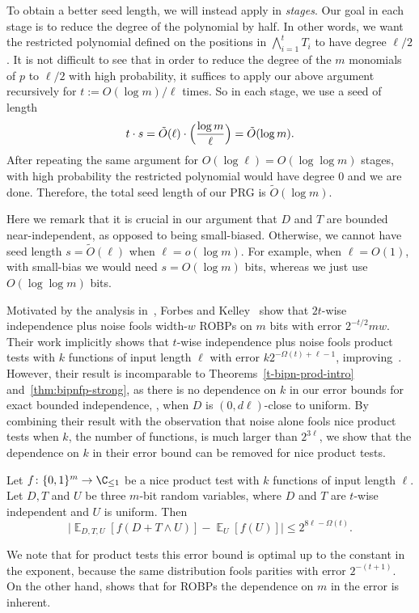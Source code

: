 \documentclass{toc}
\newcommand{\zo}{\{0,1\}}
\def\Blocklength{\ell}
\DeclareMathOperator*{\E}{\mathbb{E}}                 %
\begin{document}
To obtain a better seed length, we will instead apply  in \emph{stages}.
Our goal in each stage is to reduce the degree of the polynomial by half.
In other words, we want the restricted polynomial defined on the positions in
%
$\bigwedge_{i=1}^t T_i$  %
to have degree $\Blocklength/2$.
It is not difficult to see that in order to reduce the degree of the $m$ monomials of $p$ to $\Blocklength/2$ with high probability, it suffices to apply our above argument recursively for $t := O(\log m) / \Blocklength$ times.
So in each stage, we use a seed of length
\[
  t \cdot s = \tilde O(\Blocklength) \cdot \Bigl( \frac{\log m}{\Blocklength} \Bigr) = \tilde O(\log m) .
\]
After repeating the same argument for $O(\log \Blocklength) = O(\log\log m)$ stages, with high probability the restricted polynomial would have degree $0$ and we are done.
Therefore, the total seed length of our PRG is $\tilde O(\log m)$.

Here we remark that it is crucial in our argument that $D$ and $T$ are bounded near-independent, as opposed to being small-biased.
Otherwise, we cannot have seed length $s = \tilde O(\Blocklength)$ when $\Blocklength = o(\log m)$.
For example, when $\Blocklength = O(1)$, with small-bias we would need $s = O(\log m)$ bits, whereas we just use $O(\log \log m)$ bits.

\medskip

Motivated by the analysis in~\cite{HaramatyLV-bipnfp}, Forbes and Kelley~\cite{ForbesK18} show that $2t$-wise independence plus noise fools width-$w$ ROBPs on $m$ bits with error $2^{-t/2} mw$.
Their work implicitly shows that $t$-wise independence plus noise fools product tests with $k$ functions of input length $\Blocklength$ with error $k 2^{-\Omega(t)+\Blocklength-1}$, improving~\cite{HaramatyLV-bipnfp}.
However, their result is incomparable to Theorems~\ref{t-bipn-prod-intro} and~\ref{thm:bipnfp-strong}, as there is no dependence on $k$ in our error bounds for exact bounded independence, \ie, when $D$ is $(0,d\Blocklength)$-close to uniform.
By combining their result with the observation that noise alone fools nice product tests when $k$, the number of functions, is much
larger than $2^{3\Blocklength}$, we show that the dependence on $k$ in their error bound can be removed for nice product tests.
  \begin{theorem}\label{thm:bipnfp-optimal}
    Let $f\colon \zo^m \to \C_{\le 1}$ be a nice product test with $k$ functions of input length $\Blocklength$.
    Let $D,T$ and $U$ be three $m$-bit random variables, where $D$ and $T$ are $t$-wise independent and $U$ is uniform. %
    Then
    \[
      \Big| \E_{D,T,U}[f(D + T \wedge U)] - \E_U[f(U)] \Big| \le 2^{8\Blocklength - \Omega(t)} .
    \]
  \end{theorem}
We note that for product tests this error bound is optimal up to the constant in the exponent, because the same distribution fools parities with error $2^{-(t+1)}$.
On the other hand, \cite[Theorem~8]{BoppanaHLV19} shows that for ROBPs the dependence on $m$ in the error is inherent.
\end{document}
